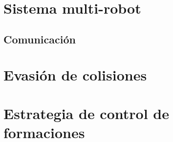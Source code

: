 \section{Sistema multi-robot}
\subsection{Comunicación}
\section{Evasión de colisiones}
\section{Estrategia de control de formaciones}
